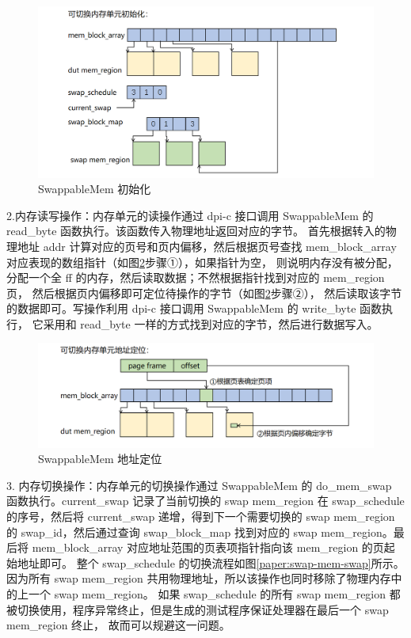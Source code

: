 \begin{figure}[!h]
    \centering
    \includegraphics[width=\linewidth]{figure/paper/swap-mem-init.png}
    \caption{SwappableMem 初始化}
    \label{paper:swap-mem-init}
\end{figure}

2.内存读写操作：内存单元的读操作通过 dpi-c 接口调用 SwappableMem 的 read\_byte 函数执行。该函数传入物理地址返回对应的字节。
首先根据转入的物理地址 addr 计算对应的页号和页内偏移，然后根据页号查找 mem\_block\_array 对应表现的数组指针（如图\ref{paper:swap-mem-addr}步骤①），如果指针为空，
则说明内存没有被分配，分配一个全 ff 的内存，然后读取数据；不然根据指针找到对应的 mem\_region 页，
然后根据页内偏移即可定位待操作的字节（如图\ref{paper:swap-mem-addr}步骤②），
然后读取该字节的数据即可。写操作利用 dpi-c 接口调用 SwappableMem 的 write\_byte 函数执行，
它采用和 read\_byte 一样的方式找到对应的字节，然后进行数据写入。\par

\begin{figure}[!h]
    \centering
    \includegraphics[width=\linewidth]{figure/paper/swap-mem-addr.png}
    \caption{SwappableMem 地址定位}
    \label{paper:swap-mem-addr}
\end{figure}

3. 内存切换操作：内存单元的切换操作通过 SwappableMem 的 do\_mem\_swap 函数执行。current\_swap 记录了当前切换的 swap mem\_region 在
swap\_schedule 的序号，然后将 current\_swap 递增，得到下一个需要切换的 swap mem\_region 的 swap\_id，然后通过查询 swap\_block\_map 
找到对应的 swap mem\_region。最后将 mem\_block\_array 对应地址范围的页表项指针指向该 mem\_region 的页起始地址即可。
整个 swap\_schedule 的切换流程如图\ref{paper:swap-mem-swap}所示。
因为所有 swap mem\_region 共用物理地址，所以该操作也同时移除了物理内存中的上一个 swap mem\_region。
如果 swap\_schedule 的所有 swap mem\_region 都被切换使用，程序异常终止，但是生成的测试程序保证处理器在最后一个 swap mem\_region 终止，
故而可以规避这一问题。\par

